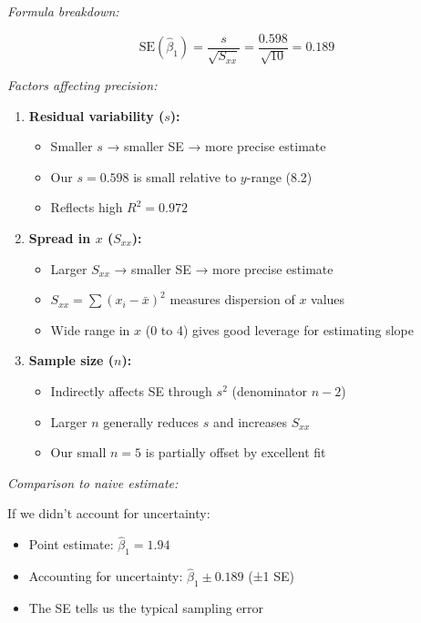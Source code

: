 \documentclass[12pt]{article}
\begin{document}
\begin{explanation}
\textit{Formula breakdown:}

\[
\text{SE}(\hat{\beta}_1) = \frac{s}{\sqrt{S_{xx}}} = \frac{0.598}{\sqrt{10}} = 0.189
\]

\textit{Factors affecting precision:}

\begin{enumerate}
    \item \textbf{Residual variability ($s$):}
    \begin{itemize}
        \item Smaller $s$ → smaller SE → more precise estimate
        \item Our $s = 0.598$ is small relative to $y$-range (8.2)
        \item Reflects high $R^2 = 0.972$
    \end{itemize}

    \item \textbf{Spread in $x$ ($S_{xx}$):}
    \begin{itemize}
        \item Larger $S_{xx}$ → smaller SE → more precise estimate
        \item $S_{xx} = \sum(x_i - \bar{x})^2$ measures dispersion of $x$ values
        \item Wide range in $x$ (0 to 4) gives good leverage for estimating slope
    \end{itemize}

    \item \textbf{Sample size ($n$):}
    \begin{itemize}
        \item Indirectly affects SE through $s^2$ (denominator $n-2$)
        \item Larger $n$ generally reduces $s$ and increases $S_{xx}$
        \item Our small $n = 5$ is partially offset by excellent fit
    \end{itemize}
\end{enumerate}

\textit{Comparison to naive estimate:}

If we didn't account for uncertainty:
\begin{itemize}
    \item Point estimate: $\hat{\beta}_1 = 1.94$
    \item Accounting for uncertainty: $\hat{\beta}_1 \pm 0.189$ (±1 SE)
    \item The SE tells us the typical sampling error
\end{itemize}


\end{explanation}
\end{document}
